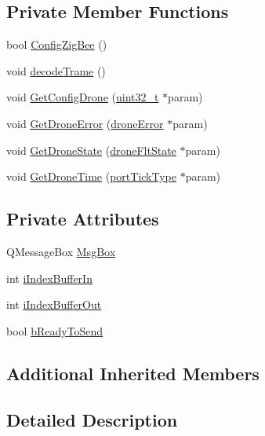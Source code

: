 \subsection*{Private Member Functions}
\begin{DoxyCompactItemize}
\item 
bool \hyperlink{classZigBee_a318ed8b8b67393a603c4bfcf0dd0524f}{Config\-Zig\-Bee} ()
\item 
void \hyperlink{classZigBee_a8967d2ce7d04ce2d267654975e5bc87c}{decode\-Trame} ()
\item 
void \hyperlink{classZigBee_a1817781f9b8e805bdd4eba25498714fe}{Get\-Config\-Drone} (\hyperlink{typdefUart_8h_a435d1572bf3f880d55459d9805097f62}{uint32\-\_\-t} $\ast$param)
\item 
void \hyperlink{classZigBee_ac4ea5e99c087a7e536d97a41ef8145d2}{Get\-Drone\-Error} (\hyperlink{typdefUart_8h_aad4124e5a34e185d704fe88506ecf352}{drone\-Error} $\ast$param)
\item 
void \hyperlink{classZigBee_a246506a3d990d052a37a4d816b88f3e6}{Get\-Drone\-State} (\hyperlink{typdefUart_8h_aac9034800b5ef8e755ade03d164e3b6c}{drone\-Flt\-State} $\ast$param)
\item 
void \hyperlink{classZigBee_a65751fbcd303e5c8e5ff63d69f5eba35}{Get\-Drone\-Time} (\hyperlink{typdefUart_8h_ae9fa5e001303f1be1c0294f26cde8caf}{port\-Tick\-Type} $\ast$param)
\end{DoxyCompactItemize}
\subsection*{Private Attributes}
\begin{DoxyCompactItemize}
\item 
Q\-Message\-Box \hyperlink{classZigBee_a7048223c8f5546e3614641cba1062357}{Msg\-Box}
\item 
int \hyperlink{classZigBee_a2b6ec705974d8db622f3eb00efeb9ad8}{i\-Index\-Buffer\-In}
\item 
int \hyperlink{classZigBee_aa510069113962d7a107f27c4d798d08c}{i\-Index\-Buffer\-Out}
\item 
bool \hyperlink{classZigBee_ac954bdd2f3b1c5bcfe11563765f10878}{b\-Ready\-To\-Send}
\end{DoxyCompactItemize}
\subsection*{Additional Inherited Members}


\subsection{Detailed Description}


